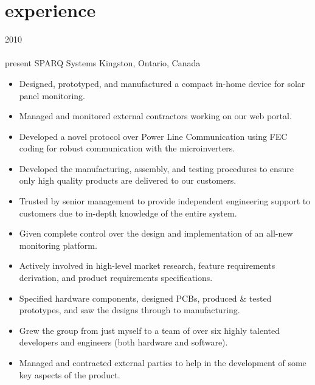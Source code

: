 
\section{experience}

\begin{entrylist}
\entry
  {2010\\\faChevronDown\\{\bodyfontit present}}
  {SPARQ Systems}
  {Kingston, Ontario, Canada}
  {
\begin{itemize}
\item Designed, prototyped, and manufactured a compact in-home device for solar panel monitoring.
\item Managed and monitored external contractors working on our web portal.
\item Developed a novel protocol over Power Line Communication using FEC coding for robust communication with the microinverters.
\item Developed the manufacturing, assembly, and testing procedures to ensure only high quality products are delivered to our customers.
\item Trusted by senior management to provide independent engineering support to customers due to in-depth knowledge of the entire system.
\end{itemize}
\begin{itemize}
\item Given complete control over the design and implementation of an all-new monitoring platform.
\item Actively involved in high-level market research, feature requirements derivation, and product requirements specifications.
\item Specified hardware components, designed PCBs, produced \& tested prototypes, and saw the designs through to manufacturing.
\item Grew the group from just myself to a team of over six highly talented developers and engineers (both hardware and software).
\item Managed and contracted external parties to help in the development of some key aspects of the product.
\end{itemize}
}
\end{entrylist}
